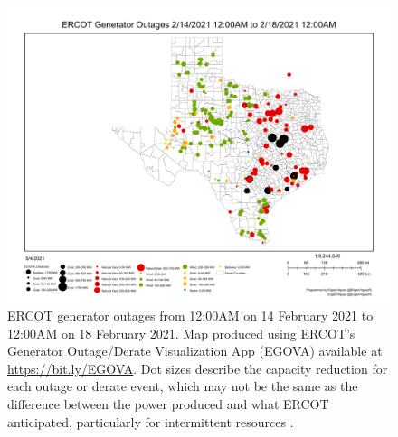 \documentclass[12pt]{iopart}
\begin{document}
\begin{figure}
  \includegraphics[width=\textwidth]{EGOVA.pdf}
  \caption{
    ERCOT generator outages from 12:00AM on 14 February 2021 to 12:00AM on 18 February 2021.
    Map produced using ERCOT's Generator Outage/Derate Visualization App (EGOVA) available at \url{https://bit.ly/EGOVA}.
    Dot sizes describe the capacity reduction for each outage or derate event, which may not be the same as the difference between the power produced and what ERCOT anticipated, particularly for intermittent resources \cite{ercotpublic_outagesv2:2021}.
  }\label{fig:egova}
\end{figure}
\end{document}

